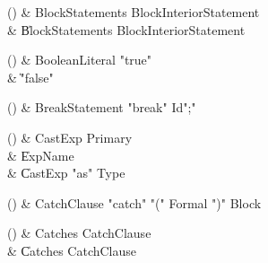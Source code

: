 \begin{bbgrammarappendix}

() & BlockStatements \label{prod:BlockStatements}  \: BlockInteriorStatement  \\

 &    \| BlockStatements BlockInteriorStatement \\

\end{bbgrammarappendix}

\begin{bbgrammarappendix}

() & BooleanLiteral \label{prod:BooleanLiteral}  \: \xcd"true"   \\

 &    \| \xcd"false"  \\

\end{bbgrammarappendix}

\begin{bbgrammarappendix}

() & BreakStatement \label{prod:BreakStatement}  \: \xcd"break" Id\opt \xcd";"  \\


\end{bbgrammarappendix}

\begin{bbgrammarappendix}

() & CastExp \label{prod:CastExp}  \: Primary  \\

 &    \| ExpName \\
 &    \| CastExp \xcd"as" Type \\

\end{bbgrammarappendix}

\begin{bbgrammarappendix}

() & CatchClause \label{prod:CatchClause}  \: \xcd"catch" \xcd"(" Formal \xcd")" Block  \\


\end{bbgrammarappendix}

\begin{bbgrammarappendix}

() & Catches \label{prod:Catches}  \: CatchClause  \\

 &    \| Catches CatchClause \\

\end{bbgrammarappendix}

